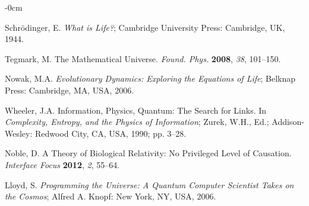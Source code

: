 \documentclass[entropy,article,submit,pdftex,moreauthors]{Definitions/mdpi}
\begin{document}


\acknowledgments{}


\begin{adjustwidth}{-\extralength}{0cm}



%

\begin{thebibliography}{999}

Schrödinger, E. \textit{What is Life?}; Cambridge University Press: Cambridge, UK, 1944.

Tegmark, M. The Mathematical Universe. \textit{Found. Phys.} \textbf{2008}, \textit{38}, 101–150. 

Nowak, M.A. \textit{Evolutionary Dynamics: Exploring the Equations of Life}; Belknap Press: Cambridge, MA, USA, 2006.

Wheeler, J.A. Information, Physics, Quantum: The Search for Links. In \textit{Complexity, Entropy, and the Physics of Information}; Zurek, W.H., Ed.; Addison-Wesley: Redwood City, CA, USA, 1990; pp. 3–28.

Noble, D. A Theory of Biological Relativity: No Privileged Level of Causation. \textit{Interface Focus} \textbf{2012}, \textit{2}, 55–64.

Lloyd, S. \textit{Programming the Universe: A Quantum Computer Scientist Takes on the Cosmos}; Alfred A. Knopf: New York, NY, USA, 2006.


\end{thebibliography}
\end{adjustwidth}
\end{document}
